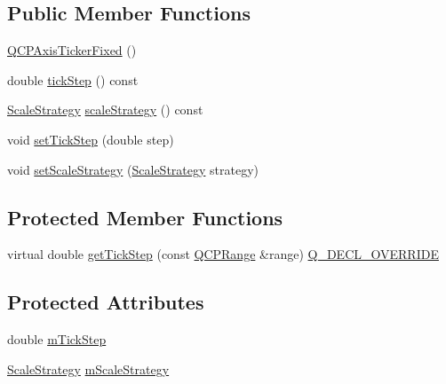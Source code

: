 \subsection*{Public Member Functions}
\begin{DoxyCompactItemize}
\item 
\mbox{\hyperlink{class_q_c_p_axis_ticker_fixed_a96d2b053a15f9b8e94550c3efeff6a34}{Q\+C\+P\+Axis\+Ticker\+Fixed}} ()
\item 
double \mbox{\hyperlink{class_q_c_p_axis_ticker_fixed_a33d1324c8666b4d5df975dea32ed5a28}{tick\+Step}} () const
\item 
\mbox{\hyperlink{class_q_c_p_axis_ticker_fixed_a15b3d38b935d404b1311eb85cfb6a439}{Scale\+Strategy}} \mbox{\hyperlink{class_q_c_p_axis_ticker_fixed_a20fd8fcb257f63449f8913335ad57e45}{scale\+Strategy}} () const
\item 
void \mbox{\hyperlink{class_q_c_p_axis_ticker_fixed_a4bc83d85a4f81d4abdd3fa5042d7b833}{set\+Tick\+Step}} (double step)
\item 
void \mbox{\hyperlink{class_q_c_p_axis_ticker_fixed_acbc7c9bcd80b3dc3edee5f0519d301f6}{set\+Scale\+Strategy}} (\mbox{\hyperlink{class_q_c_p_axis_ticker_fixed_a15b3d38b935d404b1311eb85cfb6a439}{Scale\+Strategy}} strategy)
\end{DoxyCompactItemize}
\subsection*{Protected Member Functions}
\begin{DoxyCompactItemize}
\item 
virtual double \mbox{\hyperlink{class_q_c_p_axis_ticker_fixed_a9e99da01ab92a86aed415eef32fed13a}{get\+Tick\+Step}} (const \mbox{\hyperlink{class_q_c_p_range}{Q\+C\+P\+Range}} \&range) \mbox{\hyperlink{qcustomplot_8h_a42cc5eaeb25b85f8b52d2a4b94c56f55}{Q\+\_\+\+D\+E\+C\+L\+\_\+\+O\+V\+E\+R\+R\+I\+DE}}
\end{DoxyCompactItemize}
\subsection*{Protected Attributes}
\begin{DoxyCompactItemize}
\item 
double \mbox{\hyperlink{class_q_c_p_axis_ticker_fixed_a4aeef2d3eaa57ec56f422ab1f82175d2}{m\+Tick\+Step}}
\item 
\mbox{\hyperlink{class_q_c_p_axis_ticker_fixed_a15b3d38b935d404b1311eb85cfb6a439}{Scale\+Strategy}} \mbox{\hyperlink{class_q_c_p_axis_ticker_fixed_a61ead1590161769b0d36e09419e67b10}{m\+Scale\+Strategy}}
\end{DoxyCompactItemize}


